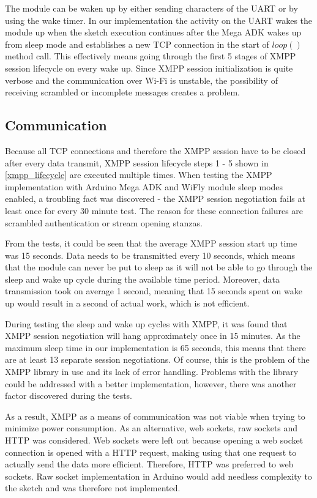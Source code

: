 The module can be waken up by either sending characters of the UART or by using the wake timer. In our implementation the activity on the UART wakes the module up when the sketch execution continues after the Mega ADK wakes up from sleep mode and establishes a new TCP connection in the start of $loop()$ method call. This effectively means going through the first 5 stages of XMPP session lifecycle on every wake up. 
Since XMPP session initialization is quite verbose and the communication over Wi-Fi is unstable, the possibility of receiving scrambled or incomplete messages creates a problem. 

\subsection{Communication}

Because all TCP connections and therefore the XMPP session have to be closed after every data transmit, XMPP session lifecycle steps 1 - 5 shown in \autoref{xmpp_lifecycle} are executed multiple times. When testing the XMPP implementation with Arduino Mega ADK and WiFly module sleep modes enabled, a troubling fact was discovered - the XMPP session negotiation fails at least once for every 30 minute test. The reason for these connection failures are scrambled authentication or stream opening stanzas. 

From the tests, it could be seen that the average XMPP session start up time was 15 seconds.  Data needs to be transmitted every 10 seconds, which means that the module can never be put to sleep as it will not be able to go through the sleep and wake up cycle during the available time period. Moreover, data transmission took on average 1 second, meaning that 15 seconds spent on wake up would result in a second of actual work, which is not efficient. 

During testing the sleep and wake up cycles with XMPP, it was found that XMPP session negotiation will hang approximately once in 15 minutes. As the maximum sleep time in our implementation is 65 seconds, this means that there are at least 13 separate session negotiations. Of course, this is the problem of the XMPP library in use and its lack of error handling. Problems with the library could be addressed with a better implementation, however, there was another factor discovered during the tests.

As a result, XMPP as a means of communication was not viable when trying to minimize power consumption. As an alternative,  web sockets, raw sockets and HTTP was considered. Web sockets were left out because opening a web socket connection is opened with a HTTP request, making using that one request to actually send the data more efficient. Therefore, HTTP was preferred to web sockets. Raw socket implementation in Arduino would add needless complexity to the sketch and was therefore not implemented. 

